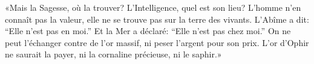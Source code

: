 «Mais la Sagesse, où la trouver? L’Intelligence, quel est son lieu?
L’homme n’en connaît pas la valeur, elle ne se trouve pas sur la terre des vivants.
L’Abîme a dit: “Elle n’est pas en moi.”
	Et la Mer a déclaré: “Elle n’est pas chez moi.”
On ne peut l’échanger contre de l’or massif, ni peser l’argent pour son prix.
	L’or d’Ophir ne saurait la payer, ni la cornaline précieuse, ni le saphir.»
